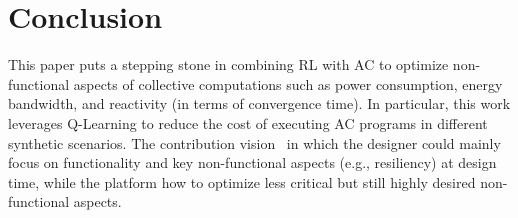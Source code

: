 \section{Conclusion}\label{acsos2022:sec:conclusion}


This paper puts a stepping stone in combining \ac{RL} with \ac{AC} 
 to optimize non-functional aspects of collective computations such as power consumption, 
 energy bandwidth, and reactivity (in terms of convergence time). 
%
In particular, this work leverages Q-Learning 
 to reduce the cost of executing \ac{AC} programs 
 in different synthetic scenarios.
%
The contribution  vision~ in which 
 the designer could mainly focus on functionality and key non-functional aspects (e.g., resiliency)
 at design time, while the platform  how 
 to optimize less critical but still highly desired non-functional aspects. %
